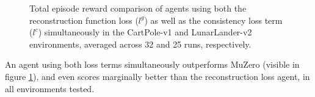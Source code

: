 \begin{figure}[ht]
    \caption{Total episode reward comparison of agents using both the reconstruction function loss ($l^g$) as well as the consistency loss term ($l^c$) simultaneously in the CartPole-v1 and LunarLander-v2 environments, averaged across 32 and 25 runs, respectively.}
    \label{fig:hybrid_results}
\end{figure}
An agent using both loss terms simultaneously outperforms MuZero (visible in figure \ref{fig:hybrid_results}), and even scores marginally better than the reconstruction loss agent, in all environments tested.

